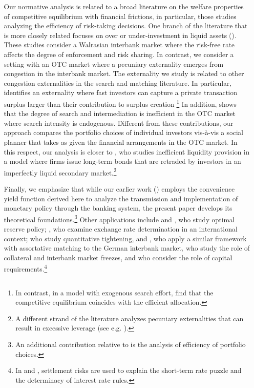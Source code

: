 \documentclass[12pt,american,english,notitlepage]{article}
\begin{document}
Our normative analysis is related to a broad literature on the welfare
properties of competitive equilibrium with financial frictions, in
particular, those studies analyzing the efficiency of risk-taking
decisions. One branch of the literature that is more closely related focuses
on over or under-investment in liquid assets (\citealp{Jacklin1987,Bhattacharya1987,Farhi2009,Yared2013,Geanakoplos2017}).
These studies consider a Walrasian interbank market where the risk-free rate affects the degree of enforcement and risk sharing. In contrast,
we consider a setting with an OTC market where a pecuniary externality
emerges from congestion in the interbank market. The externality we
study is related to other congestion externalities in the search and
matching literature. In particular, \cite{Uslu2019} identifies an externality where
fast investors can capture a private transaction surplus larger
than their contribution to surplus creation \footnote{In contrast, in a model with exogenous search effort, \cite{Afonso2015-jmcb,AL15-ECMA}
find that the competitive equilibrium coincides with the efficient allocation.} In addition, \cite{WongZhang2023} shows that the degree of search and intermediation
is inefficient in the OTC market where search intensity is endogenous.
Different from these contributions, our approach compares the portfolio
choices of individual investors vis-à-vis a social planner that takes
as given the financial arrangements in the OTC market. In this respect,
our analysis is closer to \cite{Arseneau2017}, who studies inefficient liquidity
provision in a model where firms issue long-term bonds that are retraded
by investors in an imperfectly liquid secondary market.\footnote{A different strand of the literature analyzes pecuniary externalities
that can result in excessive leverage (see e.g. \citealp{caballero2001international,Lorenzoni2008,bianchi2011overborrowing,davila2018pecuniary,amador2024bank}).}

Finally, we emphasize that while our earlier work (\citealp{BB17}) employs the convenience yield function derived here to analyze the transmission and implementation of monetary policy through the banking system, the present paper develops its theoretical foundations.\footnote{An additional contribution relative to \citet{BB17} is the analysis of efficiency of portfolio choices.} Other applications include \citet{Arce2019} and \citet{Bigio2019}, who study optimal reserve policy; \citet{Bianchi2020}, who examine exchange rate determination in an international context; \cite{LopesSalidosVissingJorgenson} who study quantitative tightening, and \citet{bittner2025assortative}, who apply a similar framework with assortative matching to the German interbank market, \cite{DeFiore2018} who study the role of collateral and interbank market freezes, and \cite{RiosRullEtAl2024} who consider the role of capital requirements.\footnote{In \citet{Piazzesi2019} and \citet{Lenel2019}, settlement risks are used to explain the short-term rate puzzle and the determinacy of interest rate rules.}
\end{document}
